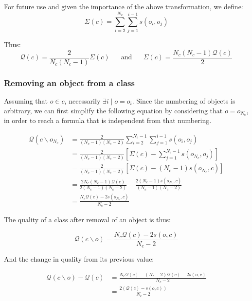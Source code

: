 \documentclass[natbib,smallextended]{svjour3}
\begin{document}
For future use and given the importance of the above transformation, we define:
\[
  \Sigma(c) = \sum_{i=2}^{N_c} \sum_{j=1}^{i-1} s\left(o_i, o_j\right)
\]

Thus:
\[
\mathcal{Q}\left(c\right) = \frac{2}{N_c(N_c-1)}\Sigma(c) \phantom{XX}\mathrm{and}\phantom{XX} \Sigma(c) = \frac{N_c(N_c-1)\mathcal{Q}\left(c\right)}{2}
\]

\subsubsection{Removing an object from a class}

Assuming that $o \in c$, necessarily $\exists i \mid o=o_i$. Since the numbering of objects is arbitrary, we can first simplify the following equation by considering that $o = o_{N_c}$, in order to reach a formula that is independent from that numbering.

\begin{equation*}
  \begin{aligned}
    \mathcal{Q}\left(c \smallsetminus o_{N_c}\right) & = \frac{2}{(N_c-1)(N_c-2)} \sum_{i=2}^{N_c-1} \sum_{j=1}^{i-1} s\left(o_i, o_j\right) \\
                                                   & = \frac{2}{(N_c-1)(N_c-2)} \left[\Sigma(c) - \sum_{j=1}^{N_c-1} s\left(o_{N_c}, o_j\right) \right] \\
                                                   & = \frac{2}{(N_c-1)(N_c-2)} \left[\Sigma(c) - (N_c-1)s\left(o_{N_c}, c\right) \right] \\
                                                   & = \frac{2N_c(N_c-1)\mathcal{Q}(c)}{2(N_c-1)(N_c-2)} - \frac{2(N_c-1)s\left(o_{N_c}, c\right)}{(N_c-1)(N_c-2)}\\
                                                   & = \frac{N_c \mathcal{Q}(c)  - 2s\left(o_{N_c}, c\right)}{N_c-2}
  \end{aligned}
\end{equation*}

The quality of a class after removal of an object is thus:

\begin{equation}
  \mathcal{Q}\left(c \smallsetminus o\right) = \frac{N_c \mathcal{Q}(c)  - 2s\left(o, c\right)}{N_c-2}
  \label{eq:newQual_remove}
\end{equation}

And the change in quality from its previous value:

\begin{equation} \label{deltaRemove}
  \begin{aligned}
    \mathcal{Q}\left(c \smallsetminus o\right) - \mathcal{Q}\left(c\right) & = \frac{N_c \mathcal{Q}(c)  - (N_c-2) \mathcal{Q}(c)  - 2s\left(o, c\right)}{N_c-2} \\
                                                                           & = \frac{2\left( \mathcal{Q}(c) - s\left(o, c\right)\right)}{N_c-2}
    \end{aligned}
\end{equation}
\end{document}
